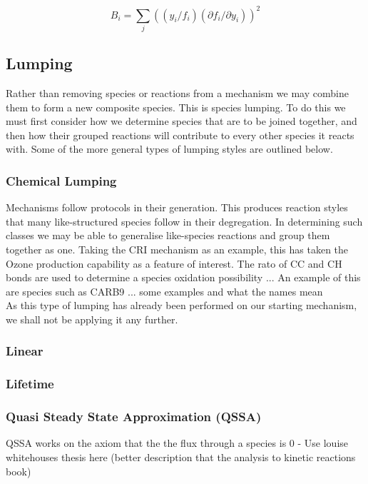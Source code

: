 \documentclass{pasa}%
\begin{document}
\begin{equation}
B_i  = \sum_j(({y_i}/{f_i})({\partial f_i}/{\partial y_i}))^2 \label{connectivity}
\end{equation}

\subsection{Lumping}
Rather than removing species or reactions from a mechanism we may combine them to form a new composite species. This is species lumping. To do this we must first consider how we determine species that are to be joined together, and then how their grouped reactions will contribute to every other species it reacts with. Some of the more general types of lumping styles are outlined below. 


\subsubsection{Chemical Lumping}
Mechanisms follow protocols in their generation. This produces reaction styles that many like-structured species follow in their degregation. In determining such classes we may be able to generalise like-species reactions and group them together as one. Taking the CRI mechanism as an example, this has taken the Ozone production capability as a feature of interest. The rato of CC and CH bonds are used to determine a species oxidation possibility ... An example of this are species such as CARB9  ... some examples and what the names mean \\

As this type of lumping has already been performed on our starting mechanism, we shall not be applying it any further. 


\subsubsection{Linear}
\subsubsection{Lifetime}
\subsubsection{Quasi Steady State Approximation (QSSA)}
QSSA works on the axiom that the the flux through a species is 0  - Use louise whitehouses thesis here (better description that the analysis to kinetic reactions book)
\end{document}

